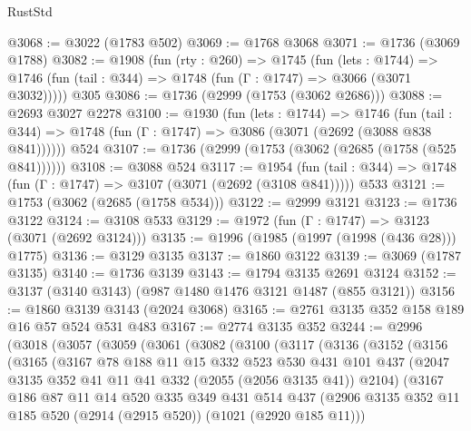 \begin{lexlean}{RustStd}
\begin{coremodule}
@3068 := @3022 (@1783 @502)
@3069 := @1768 @3068
@3071 := @1736 (@3069 @1788)
@3082 := @1908
    (fun (rty : @260) =>
    @1745
      (fun (lets : @1744) =>
      @1746 (fun (tail : @344) => @1748 (fun (Γ : @1747) => @3066 (@3071 @3032)))))
    @305
@3086 := @1736 (@2999 (@1753 (@3062 @2686)))
@3088 := @2693 @3027 @2278
@3100 := @1930
    (fun (lets : @1744) =>
    @1746 (fun (tail : @344) => @1748 (fun (Γ : @1747) => @3086 (@3071 (@2692 (@3088 @838 @841))))))
    @524
@3107 := @1736 (@2999 (@1753 (@3062 (@2685 (@1758 (@525 @841))))))
@3108 := @3088 @524
@3117 := @1954
    (fun (tail : @344) => @1748 (fun (Γ : @1747) => @3107 (@3071 (@2692 (@3108 @841)))))
    @533
@3121 := @1753 (@3062 (@2685 (@1758 @534)))
@3122 := @2999 @3121
@3123 := @1736 @3122
@3124 := @3108 @533
@3129 := @1972 (fun (Γ : @1747) => @3123 (@3071 (@2692 @3124)))
@3135 := @1996 (@1985 (@1997 (@1998 (@436 @28))) @1775)
@3136 := @3129 @3135
@3137 := @1860 @3122
@3139 := @3069 (@1787 @3135)
@3140 := @1736 @3139
@3143 := @1794 @3135 @2691 @3124
@3152 := @3137 (@3140 @3143) (@987 @1480 @1476 @3121 @1487 (@855 @3121))
@3156 := @1860 @3139 @3143 (@2024 @3068)
@3165 := @2761 @3135 @352 @158 @189 @16 @57 @524 @531 @483
@3167 := @2774 @3135 @352
@3244 := @2996
    (@3018
      (@3057
        (@3059
          (@3061
            (@3082
              (@3100
                (@3117
                  (@3136
                    (@3152
                      (@3156
                        (@3165
                          (@3167
                            @78
                            @188
                            @11
                            @15
                            @332
                            @523
                            @530
                            @431
                            @101
                            @437
                            (@2047 @3135 @352 @41 @11 @41 @332 (@2055 (@2056 @3135 @41)) @2104)
                            (@3167
                              @186
                              @87
                              @11
                              @14
                              @520
                              @335
                              @349
                              @431
                              @514
                              @437
                              (@2906
                                @3135
                                @352
                                @11
                                @185
                                @520
                                (@2914 (@2915 @520))
                                (@1021 (@2920 @185 @11)))

\end{coremodule}
\end{lexlean}
